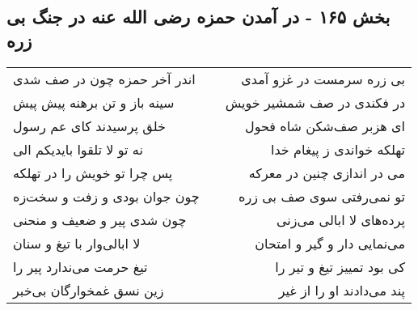 \begin{center}
\section*{بخش ۱۶۵ - در آمدن حمزه رضی الله عنه در جنگ بی زره}
\label{sec:sh165}
\begin{longtable}{l p{0.5cm} r}
اندر آخر حمزه چون در صف شدی
&&
بی زره سرمست در غزو آمدی
\\
سینه باز و تن برهنه پیش پیش
&&
در فکندی در صف شمشیر خویش
\\
خلق پرسیدند کای عم رسول
&&
ای هزبر صف‌شکن شاه فحول
\\
نه تو لا تلقوا بایدیکم الی
&&
تهلکه خواندی ز پیغام خدا
\\
پس چرا تو خویش را در تهلکه
&&
می در اندازی چنین در معرکه
\\
چون جوان بودی و زفت و سخت‌زه
&&
تو نمی‌رفتی سوی صف بی زره
\\
چون شدی پیر و ضعیف و منحنی
&&
پرده‌های لا ابالی می‌زنی
\\
لا ابالی‌وار با تیغ و سنان
&&
می‌نمایی دار و گیر و امتحان
\\
تیغ حرمت می‌ندارد پیر را
&&
کی بود تمییز تیغ و تیر را
\\
زین نسق غمخوارگان بی‌خبر
&&
پند می‌دادند او را از غیر
\\
\end{longtable}
\end{center}
